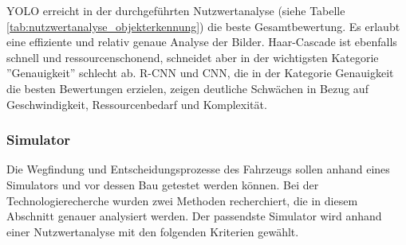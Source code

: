 \begin{table}[H]
    \caption{Nutzwertanalyse Objekterkennung}
    \label{tab:nutzwertanalyse_objekterkennung}
\end{table}

YOLO erreicht in der durchgeführten Nutzwertanalyse (siehe Tabelle \ref{tab:nutzwertanalyse_objekterkennung}) die beste Gesamtbewertung. Es erlaubt eine effiziente und relativ genaue Analyse der Bilder.
Haar-Cascade ist ebenfalls schnell und ressourcenschonend, schneidet aber in der wichtigsten Kategorie ''Genauigkeit'' schlecht ab.
R-CNN und CNN, die in der Kategorie Genauigkeit die besten Bewertungen erzielen, zeigen deutliche Schwächen in Bezug auf Geschwindigkeit, Ressourcenbedarf und Komplexität.


\subsubsection{Simulator}
Die Wegfindung und Entscheidungsprozesse des Fahrzeugs sollen anhand eines Simulators und vor dessen Bau getestet werden können. Bei der Technologierecherche wurden zwei Methoden recherchiert, die in diesem Abschnitt genauer analysiert werden.
Der passendste Simulator wird anhand einer Nutzwertanalyse mit den folgenden Kriterien gewählt.

